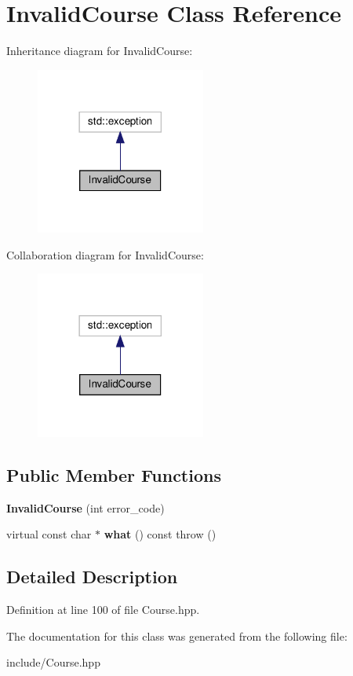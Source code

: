 \hypertarget{classInvalidCourse}{}\section{Invalid\+Course Class Reference}
\label{classInvalidCourse}


Inheritance diagram for Invalid\+Course\+:\nopagebreak
\begin{figure}[H]
\begin{center}
\leavevmode
\includegraphics[width=158pt]{classInvalidCourse__inherit__graph}
\end{center}
\end{figure}


Collaboration diagram for Invalid\+Course\+:\nopagebreak
\begin{figure}[H]
\begin{center}
\leavevmode
\includegraphics[width=158pt]{classInvalidCourse__coll__graph}
\end{center}
\end{figure}
\subsection*{Public Member Functions}
\begin{DoxyCompactItemize}
\item 
\mbox{\label{classInvalidCourse_a7c63453c372463502e1c4ba9766d15dd}} 
{\bfseries Invalid\+Course} (int error\+\_\+code)
\item 
\mbox{\label{classInvalidCourse_a103858b14f6b2e7e5b9cbf304cc1b1fd}} 
virtual const char $\ast$ {\bfseries what} () const  throw ()
\end{DoxyCompactItemize}


\subsection{Detailed Description}


Definition at line 100 of file Course.\+hpp.



The documentation for this class was generated from the following file\+:\begin{DoxyCompactItemize}
\item 
include/Course.\+hpp\end{DoxyCompactItemize}
